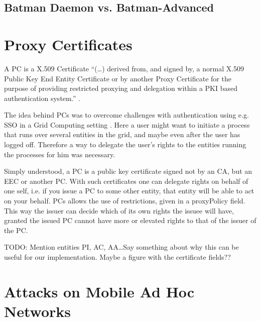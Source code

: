 \subsection{Batman Daemon vs. Batman-Advanced}

\section{Proxy Certificates}
\label{sect:pc}
A \acf{PC} is a X.509 Certificate ``(\ldots) derived from, and signed by, a
normal X.509 Public Key End Entity Certificate or by another Proxy Certificate
for the purpose of providing restricted proxying and delegation within a PKI
based authentication system.'' \cite{rfc3820}.

The idea behind \acp{PC} was to overcome challenges with authentication
using e.g. \ac{SSO} in a Grid Computing setting \cite{foster1998security}. Here
a user might want to initiate a process that runs over several entities in the
grid, and maybe even after the user has logged off. Therefore a way to delegate
the user's rights to the entities running the processes for him was necessary.

Simply understood, a \ac{PC} is a public key certificate signed not
by an \ac{CA}, but an \ac{EEC} or another \ac{PC}. With such certificates one
can delegate rights on behalf of one self, i.e. if you issue a \ac{PC} to some
other entity, that entity will be able to act on your behalf. \acp{PC} allows
the use of restrictions, given in a proxyPolicy field. This way the issuer can
decide which of its own rights the issuee will have, granted the issued \ac{PC}
cannot have more or elevated rights to that of the issuer of the \ac{PC}.

TODO: Mention entities PI, AC, AA\ldots Say something about why this can be
useful for our implementation. Maybe a figure with the certificate fields??




\section{Attacks on Mobile Ad Hoc Networks}
